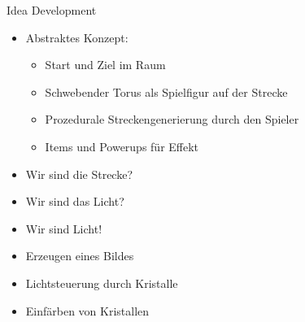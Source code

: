 \slideonetoone
{Idea Development}
{
	\begin{itemize}
		\item Abstraktes Konzept:
		\begin{itemize}
			\item Start und Ziel im Raum
			\item Schwebender Torus als Spielfigur auf der Strecke
			\item Prozedurale Streckengenerierung durch den Spieler
			\item Items und Powerups für Effekt
		\end{itemize}
		\item Wir sind die Strecke?
		\item Wir sind das Licht?
		\item Wir sind Licht!
		\item Erzeugen eines Bildes
		\item Lichtsteuerung durch Kristalle
		\item Einfärben von Kristallen
	\end{itemize}
}
